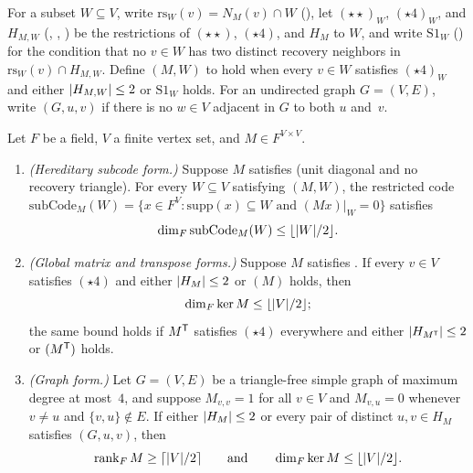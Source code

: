 For a subset $W \subseteq V$, write $\mathrm{rs}_W(v) = N_M(v) \cap W$ (), let $(\star\star)_W$,
$(\star 4)_W$, and $H_{M,W}$ (, , )
be the restrictions of $(\star\star)$, $(\star 4)$, and $H_M$ to $W$, and write $\mathrm{S1}_W$ ()
for the condition that no $v \in W$ has two distinct recovery neighbors in $\mathrm{rs}_W(v) \cap H_{M,W}$. Define
$(M, W)$ to hold when every $v \in W$ satisfies $(\star 4)_W$ and either $\lvert H_{M,W} \rvert \le 2$ or
$\mathrm{S1}_W$ holds. For an undirected graph $G = (V, E)$, write $(G, u, v)$ if there is no $w \in V$
adjacent in $G$ to both $u$ and~$v$.

\begin{theorem}\label{thm:SHstar}
Let $F$ be a field, $V$ a finite vertex set, and $M \in F^{V \times V}$.
\begin{enumerate}
\item \emph{(Hereditary subcode form.)} Suppose $M$ satisfies  (unit diagonal and no recovery
  triangle). For every $W \subseteq V$ satisfying $(M, W)$, the restricted code $\mathrm{subCode}_M(W) =
  \{x \in F^V : \mathrm{supp}(x) \subseteq W \text{ and } (Mx)|_W = 0\}$ satisfies
  \[
    \dim_F \mathrm{subCode}_M(W) \le \lfloor \lvert W \rvert / 2 \rfloor.
  \]
\item \emph{(Global matrix and transpose forms.)} Suppose $M$ satisfies . If every $v \in V$
  satisfies $(\star 4)$ and either $\lvert H_M \rvert \le 2$ or $(M)$ holds, then
  \[
    \dim_F \ker M \le \lfloor \lvert V \rvert / 2 \rfloor;
  \]
  the same bound holds if $M^{\mathsf{T}}$ satisfies $(\star 4)$ everywhere and either $\lvert H_{M^{\mathsf{T}}} \rvert \le 2$ or
  $(M^{\mathsf{T}})$ holds.
\item \emph{(Graph form.)} Let $G = (V, E)$ be a triangle-free simple graph of maximum degree at most~$4$, and suppose
  $M_{v,v} = 1$ for all $v \in V$ and $M_{v,u} = 0$ whenever $v \ne u$ and $\{v, u\} \notin E$. If either $\lvert H_M \rvert \le 2$
  or every pair of distinct $u, v \in H_M$ satisfies $(G, u, v)$, then
  \[
    \operatorname{rank}_F M \ge \lceil \lvert V \rvert / 2 \rceil \qquad\text{and}\qquad \dim_F \ker M \le \lfloor \lvert V \rvert / 2 \rfloor.
  \]
\end{enumerate}
\end{theorem}

